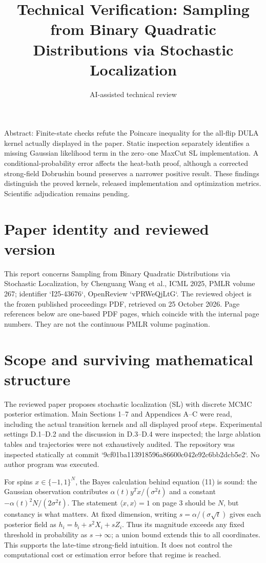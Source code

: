 \documentclass[10pt]{article}
\title{Technical Verification: Sampling from Binary Quadratic Distributions via Stochastic Localization}
\author{AI-assisted technical review}
\date{}
\begin{document}
\maketitle
Abstract: Finite-state checks refute the Poincare inequality for the all-flip DULA kernel actually displayed in the paper. Static inspection separately identifies a missing Gaussian likelihood term in the zero–one MaxCut SL implementation. A conditional-probability error affects the heat-bath proof, although a corrected strong-field Dobrushin bound preserves a narrower positive result. These findings distinguish the proved kernels, released implementation and optimization metrics. Scientific adjudication remains pending.\par
\section*{Paper identity and reviewed version}
This report concerns Sampling from Binary Quadratic Distributions via Stochastic Localization, by Chenguang Wang et al., ICML 2025, PMLR volume 267; identifier `I25-43676`, OpenReview `vPRWeQjLtG`. The reviewed object is the frozen published proceedings PDF, retrieved on 25 October 2026. Page references below are one-based PDF pages, which coincide with the internal page numbers. They are not the continuous PMLR volume pagination.\par
\section*{Scope and surviving mathematical structure}
The reviewed paper proposes stochastic localization (SL) with discrete MCMC posterior estimation. Main Sections 1–7 and Appendices A–C were read, including the actual transition kernels and all displayed proof steps. Experimental settings D.1–D.2 and the discussion in D.3–D.4 were inspected; the large ablation tables and trajectories were not exhaustively audited. The repository was inspected statically at commit `9cf01ba113918596a86600c042e92c6bb2dcb5e2`. No author program was executed.\par
For spins \(x\in\{-1,1\}^N\), the Bayes calculation behind equation (11) is sound: the Gaussian observation contributes \(\alpha(t)y^Tx/(\sigma^2t)\) and a constant \(-\alpha(t)^2N/(2\sigma^2t)\). The statement \(\langle x,x\rangle=1\) on page 3 should be \(N\), but constancy is what matters. At fixed dimension, writing \(s=\alpha/(\sigma\sqrt t)\) gives each posterior field as \(h_i=b_i+s^2X_i+sZ_i\). Thus its magnitude exceeds any fixed threshold in probability as \(s\to\infty\); a union bound extends this to all coordinates. This supports the late-time strong-field intuition. It does not control the computational cost or estimation error before that regime is reached.\par
\end{document}
